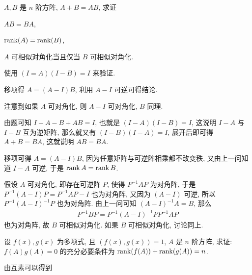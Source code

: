 \begin{exercise}[series=exer]
\begin{answer}
    \end{answer}
    \item $ A, B $ 是 $ n $ 阶方阵, $ A + B = AB $, 求证
    \begin{exercise}
        \item $ AB = BA $,
        \item $ \rank(A) = \rank(B) $,
        \item $ A $ 可相似对角化当且仅当 $ B $ 可相似对角化.
    \end{exercise}
    \begin{hint}
        \begin{hintsheet}
            \item 使用 $ (I = A)(I - B) = I $ 来验证.
            \item 移项得 $ A = (A - I)B $, 利用 $ A - I $ 可逆可得结论.
            \item 注意到如果 $ A $ 可对角化, 则 $ A - I $ 可对角化, $ B $ 同理.
        \end{hintsheet}
    \end{hint}
    \begin{answer}
        \begin{answersheet}
            \item 由题可知 $ I - A - B + AB = I $, 也就是 $ (I - A)(I - B) = I $, 这说明 $ I - A $ 与 $ I - B $ 互为逆矩阵, 那么就又有 $ (I - B)(I - A) = I $, 展开后即可得 $ A + B = BA $, 这就说明 $ AB = BA $.
            \item 移项可得 $ A = (A - I)B $, 因为任意矩阵与可逆阵相乘都不改变秩, 又由上一问知道 $ I - A $ 可逆, 于是 $ \rank A = \rank B $.
            \item 假设 $ A $ 可对角化, 即存在可逆阵 $ P $, 使得 $ P^{-1}AP $ 为对角阵, 于是 $ P^{-1}(A - I)P = P^{-1}AP - I $ 也为对角阵, 又因为 $ (A - I) $ 可逆, 所以 $ P^{-1}(A - I)^{-1}P $ 也为对角阵. 由上一问可知 $ (A - I)^{-1}A = B $, 那么
            \begin{align*}
                P^{-1}BP = P^{-1}(A - I)^{-1}PP^{-1}AP
            \end{align*}
            也为对角阵, 故 $ B $ 可相似对角化. 如果 $ B $ 可相似对角化, 讨论同上.
        \end{answersheet}
    \end{answer}
    \sitem 设 $ f(x), g(x) $ 为多项式, 且 $ (f(x), g(x)) = 1 $, $ A $ 是 $ n $ 阶方阵, 求证: $ f(A)g(A) = 0 $ 的充分必要条件为 $ \rank(f(A)) + \rank(g(A)) = n $.
    \begin{hint}
        由互素可以得到
        \begin{align*}

\end{align*}
\end{hint}
\end{exercise}
